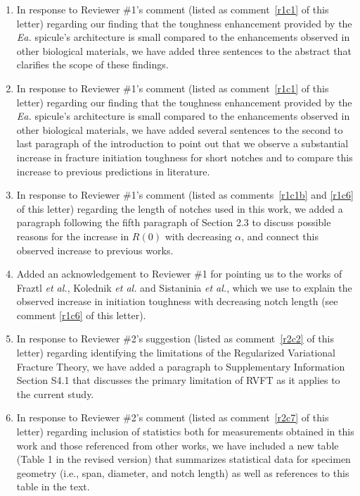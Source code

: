 \documentclass[11pt,letterpaper]{report}
\makeatletter
\newcommand{\EA}{\textit{Ea.\@}\xspace}
\makeatother
\begin{document}
\begin{enumerate}[label=\textit{Mc.\arabic*}]
\item \label{Mc01} In response to Reviewer \#1's comment (listed as comment~\ref{r1c1} of this letter) regarding our finding that the toughness enhancement provided by the \EA spicule's architecture is small compared to the enhancements observed in other biological materials, we have added three sentences to the abstract that clarifies the scope of these findings.
%
\item \label{Mc02} In response to Reviewer \#1's comment (listed as comment~\ref{r1c1} of this letter) regarding our finding that the toughness enhancement provided by the \EA spicule's architecture is small compared to the enhancements observed in other biological materials, we have added several sentences to the second to last paragraph of the introduction to point out that we observe a substantial increase in fracture initiation toughness for short notches and to compare this increase to previous predictions in literature.
%
\item \label{Mc04} In response to Reviewer \#1's comment (listed as comments~\ref{r1c1b} and \ref{r1c6} of this letter) regarding the length of notches used in this work, we added a paragraph following the fifth paragraph of Section 2.3 to discuss possible reasons for the increase in $R(0)$ with decreasing $\alpha$, and connect this observed increase to previous works.
%
\item \label{Mc04b} Added an acknowledgement to Reviewer \#1 for pointing us to the works of Fraztl \textit{et al.}, Kolednik \textit{et al.} and Sistaninia \textit{et al.}, which we use to explain the observed increase in initiation toughness with decreasing notch length (see comment \ref{r1c6} of this letter).
%
\item \label{Mc1} In response to Reviewer \#2's suggestion (listed as comment~\ref{r2c2} of this letter) regarding identifying the limitations of the Regularized Variational Fracture Theory, we have added a paragraph to Supplementary Information Section S4.1 that discusses the primary limitation of RVFT as it applies to the current study. 
%
\item \label{Mc2} In response to Reviewer \#2's comment (listed as comment~\ref{r2c7} of this letter) regarding inclusion of statistics both for measurements obtained in this work and those referenced from other works, we have included a new table (Table 1 in the revised version) that summarizes statistical data for specimen geometry (i.e., span, diameter, and notch length) as well as references to this table in the text.

\end{enumerate}
\end{document}
